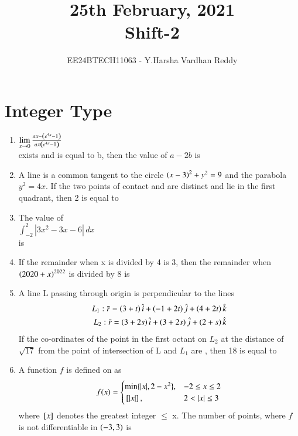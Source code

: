 \documentclass[journal,,12pt,onecolumn]{IEEEtran}
\theoremstyle{remark}
\begin{document}

\vspace{3cm}

\title{25th February, 2021\\Shift-2}
\author{EE24BTECH11063 - Y.Harsha Vardhan Reddy}
\maketitle

\bigskip

\renewcommand{\thefigure}{\theenumi}
\renewcommand{\thetable}{\theenumi}


\section*{Integer Type}
\begin{enumerate}
 \item $\lim \limits_{x\to 0} \frac{ax-\left(e^{4x}-1\right)}{ax\left(e^{4x}-1\right)} $\\
 exists and is equal to b, then the value of $a-2b$ is
 \item A line is a common tangent to the circle $\left(x-3\right)^2+y^2=9$ and the parabola $y^2=4x$. If the two points of contact  and  are distinct and lie in the first quadrant, then 2 is equal to
 \item The value of \\
 $\int_{-2}^{2} |3x^2-3x-6| \, dx$\\
 is
 \item If the remainder when x is divided by 4 is 3, then the remainder when $\left(2020+x\right)^{2022}$ is divided by 8 is

 \item A line L passing through origin is perpendicular to the lines 
 \begin{align*}
     L_1:\Bar{r}=\left(3+t\right)\hat{i}+\left(-1+2t\right)\hat{j}+\left(4+2t\right)\hat{k}\\
     L_2:\Bar{r}=\left(3+2s\right)\hat{i}+\left(3+2s\right)\hat{j}+\left(2+s\right)\hat{k}
 \end{align*}
 If the co-ordinates of the point in the first octant on $L_2$ at the distance of $\sqrt{17}$ from the point of intersection of L and $L_1$ are , then 18 is equal to
 \item A function $f$ is defined on  as\\
 \[
f(x) = 
\begin{cases} 
\min\{|x|, 2 - x^2\}, & -2 \leq x \leq 2 \\
{}\left[|x|\right], & 2 < |x| \leq 3 
\end{cases}
\]
where ${}\left[x\right]$ denotes the greatest integer $\le$ x. The number of points, where $f$ is not differentiable in $\left(-3,3\right)$ is
 

\end{enumerate}
\end{document}
